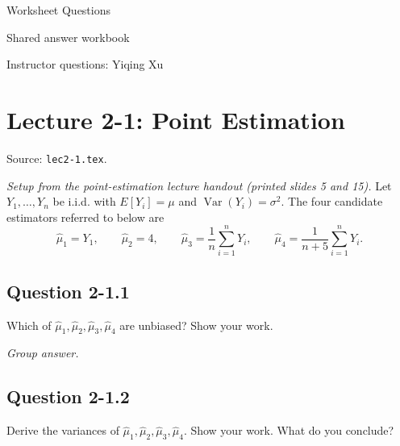 \documentclass[11pt,letterpaper]{article}
\newcommand{\Var}{\operatorname{Var}}
\newenvironment{groupanswer}
  {\par\smallskip\noindent\textit{Group answer.}\par\nopagebreak\smallskip}
  {\par\medskip}
\begin{document}
\begin{center}
{\LARGE Worksheet Questions}\par
\smallskip
Shared answer workbook
\par\smallskip
{\small Instructor questions: Yiqing Xu}
\end{center}

\section*{Lecture 2-1: Point Estimation}

{\small Source: \texttt{lec2-1.tex}.}


\textit{Setup from the point-estimation lecture handout (printed slides 5 and 15).}
Let $Y_1,\ldots,Y_n$ be i.i.d. with $E[Y_i]=\mu$ and $\Var(Y_i)=\sigma^2$.
The four candidate estimators referred to below are
\[
\hat\mu_1=Y_1,\qquad
\hat\mu_2=4,\qquad
\hat\mu_3=\frac{1}{n}\sum_{i=1}^n Y_i,\qquad
\hat\mu_4=\frac{1}{n+5}\sum_{i=1}^n Y_i.
\]


\subsection*{Question 2-1.1}

\label{q:lec2-1-1}


Which of $\hat\mu_{1}, \hat\mu_{2}, \hat\mu_{3}, \hat\mu_{4}$ are unbiased? Show your work.


\begin{groupanswer}
\vspace{\baselineskip}
\end{groupanswer}


\subsection*{Question 2-1.2}

\label{q:lec2-1-2}


Derive the variances of $\hat\mu_{1}, \hat\mu_{2}, \hat\mu_{3}, \hat\mu_{4}$. Show your work. What do you conclude?

\end{document}
